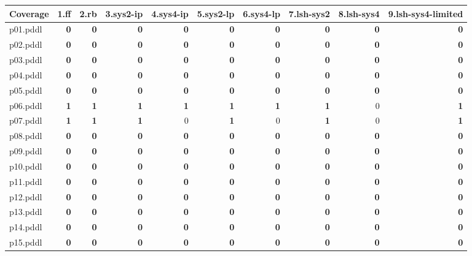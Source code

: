 \documentclass{article}
\begin{document}
\begin{tabular}{@{}lrrrrrrrrr@{}}
Coverage & 1.ff & 2.rb & 3.sys2-ip & 4.sys4-ip & 5.sys2-lp & 6.sys4-lp & 7.lsh-sys2 & 8.lsh-sys4 & 9.lsh-sys4-limited \\
\midrule
p01.pddl & \textbf{0} & \textbf{0} & \textbf{0} & \textbf{0} & \textbf{0} & \textbf{0} & \textbf{0} & \textbf{0} & \textbf{0} \\
p02.pddl & \textbf{0} & \textbf{0} & \textbf{0} & \textbf{0} & \textbf{0} & \textbf{0} & \textbf{0} & \textbf{0} & \textbf{0} \\
p03.pddl & \textbf{0} & \textbf{0} & \textbf{0} & \textbf{0} & \textbf{0} & \textbf{0} & \textbf{0} & \textbf{0} & \textbf{0} \\
p04.pddl & \textbf{0} & \textbf{0} & \textbf{0} & \textbf{0} & \textbf{0} & \textbf{0} & \textbf{0} & \textbf{0} & \textbf{0} \\
p05.pddl & \textbf{0} & \textbf{0} & \textbf{0} & \textbf{0} & \textbf{0} & \textbf{0} & \textbf{0} & \textbf{0} & \textbf{0} \\
p06.pddl & \textbf{1} & \textbf{1} & \textbf{1} & \textbf{1} & \textbf{1} & \textbf{1} & \textbf{1} & 0 & \textbf{1} \\
p07.pddl & \textbf{1} & \textbf{1} & \textbf{1} & 0 & \textbf{1} & 0 & \textbf{1} & 0 & \textbf{1} \\
p08.pddl & \textbf{0} & \textbf{0} & \textbf{0} & \textbf{0} & \textbf{0} & \textbf{0} & \textbf{0} & \textbf{0} & \textbf{0} \\
p09.pddl & \textbf{0} & \textbf{0} & \textbf{0} & \textbf{0} & \textbf{0} & \textbf{0} & \textbf{0} & \textbf{0} & \textbf{0} \\
p10.pddl & \textbf{0} & \textbf{0} & \textbf{0} & \textbf{0} & \textbf{0} & \textbf{0} & \textbf{0} & \textbf{0} & \textbf{0} \\
p11.pddl & \textbf{0} & \textbf{0} & \textbf{0} & \textbf{0} & \textbf{0} & \textbf{0} & \textbf{0} & \textbf{0} & \textbf{0} \\
p12.pddl & \textbf{0} & \textbf{0} & \textbf{0} & \textbf{0} & \textbf{0} & \textbf{0} & \textbf{0} & \textbf{0} & \textbf{0} \\
p13.pddl & \textbf{0} & \textbf{0} & \textbf{0} & \textbf{0} & \textbf{0} & \textbf{0} & \textbf{0} & \textbf{0} & \textbf{0} \\
p14.pddl & \textbf{0} & \textbf{0} & \textbf{0} & \textbf{0} & \textbf{0} & \textbf{0} & \textbf{0} & \textbf{0} & \textbf{0} \\
p15.pddl & \textbf{0} & \textbf{0} & \textbf{0} & \textbf{0} & \textbf{0} & \textbf{0} & \textbf{0} & \textbf{0} & \textbf{0} \\

\end{tabular}
\end{document}
